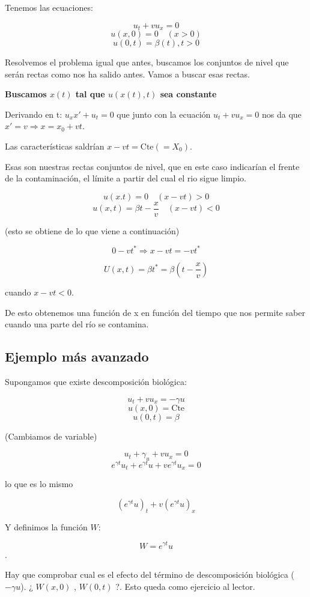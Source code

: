 \documentclass[palatino]{apuntes}
\begin{document}
Tenemos las ecuaciones:

$$u_t + vu_x = 0$$
$$u(x,0) = 0 \quad (x>0) $$
$$u(0,t) = \beta(t), t>0$$


Resolvemos el problema igual que antes, buscamos los conjuntos de nivel que serán rectas como nos ha salido antes. Vamos a buscar esas rectas.

\textbf{Buscamos $x(t)$ tal que $u(x(t),t)$ sea constante}

Derivando en t: $u_x x' + u_t = 0$ que junto con la ecuación $u_t + v u_x = 0$ nos da que $x' = v \Rightarrow x = x_0 + vt $.

Las características saldrían $x-vt = \text{Cte}(=X_0)$.

Esas son nuestras rectas conjuntos de nivel, que en este caso indicarían el frente de la contaminación, el límite a partir del cual el rio sigue limpio.

$$u(x.t) = 0 \quad(x-vt) > 0 $$
$$u(x,t) = \beta{t - \frac{x}{v}} \quad (x-vt) < 0 $$

(esto se obtiene de lo que viene a continuación)

$$0 - vt^{*} \Rightarrow x-vt = -vt^{*}$$

$$U(x,t) = \beta{t^*} = \beta(t - \frac{x}{v})$$

cuando $x - vt < 0$. 

De esto obtenemos una función de x en función del tiempo que nos permite saber cuando una parte del río se contamina.

\subsection{Ejemplo más avanzado}

Supongamos que existe descomposición biológica:

$$u_t + vu_x = -\gamma u$$
$$u(x,0) = \text{Cte}$$
$$u(0,t) = \beta$$

(Cambiamos de variable)

$$u_t + \gamma_u + vu_x = 0$$
$$e^{\gamma t} u_t + e^{\gamma t} u + v e^{ \gamma t} u_x = 0 $$

lo que es lo mismo 

$$(e^{\gamma t}u)_t + v (e^{\gamma t} u)_x$$

Y definimos la función $W$:

$$W = e^{\gamma t}u$$.


Hay que comprobar cual es el efecto del término de descomposición biológica ($-\gamma u$). ¿ $W(x,0)$ , $ W(0,t)$ ?. Esto queda como ejercicio al lector.
\end{document}
